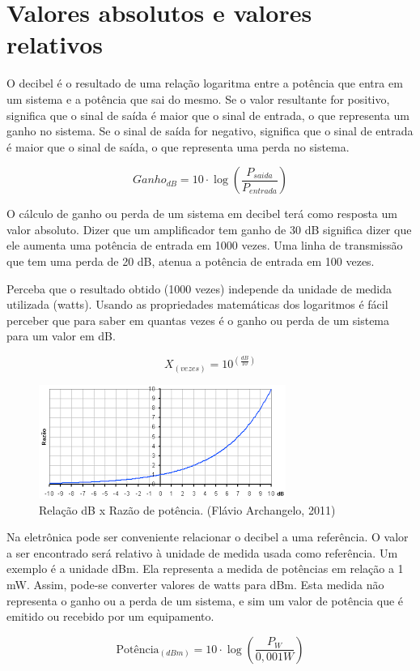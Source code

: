 \section{Valores absolutos e valores relativos}
    O decibel é o resultado de uma relação logaritma entre a potência que entra em um sistema e a potência que sai do mesmo. Se o valor resultante for positivo, significa que o sinal de saída é maior que o sinal de entrada, o que representa um ganho no sistema. Se o sinal de saída for negativo, significa que o sinal de entrada é maior que o sinal de saída, o que representa uma perda no sistema. \cite{embarcados}
    
    \begin{equation*}
        Ganho_{dB} = 10 \cdot \log (\frac{P_{saida}}{P_{entrada}})
    \end{equation*}
    
    O cálculo de ganho ou perda de um sistema em decibel terá como resposta um valor absoluto. Dizer que um amplificador tem ganho de 30 dB significa dizer que ele aumenta uma potência de entrada em 1000 vezes. Uma linha de transmissão que tem uma perda de 20 dB, atenua a potência de entrada em 100 vezes.
    
    Perceba que o resultado obtido (1000 vezes) independe da unidade de medida utilizada (watts). Usando as propriedades matemáticas dos logaritmos é fácil perceber que para saber em quantas vezes é o ganho ou perda de um sistema para um valor em dB.

    \begin{equation*}
        X_{(vezes)} = 10^{(\frac{dB}{10})}
    \end{equation*}
    
    \begin{figure}[ht]
        \centering
        \includegraphics{db_razaop.png}
        \caption{Relação dB x Razão de potência. (Flávio Archangelo, 2011)}
    \end{figure}
    
    \newpage
    Na eletrônica pode ser conveniente relacionar o decibel a uma referência. O valor a ser encontrado será relativo à unidade de medida usada como referência. Um exemplo é a unidade dBm. Ela representa a medida de potências em relação a 1 mW. Assim, pode-se converter valores de watts para dBm. Esta medida não representa o ganho ou a perda de um sistema, e sim um valor de potência que é emitido ou recebido por um equipamento.
    
    \begin{equation*}
        \text{Potência}_{(dBm)} = 10 \cdot \log (\frac{P_{W}}{0,001W})
    \end{equation*}
